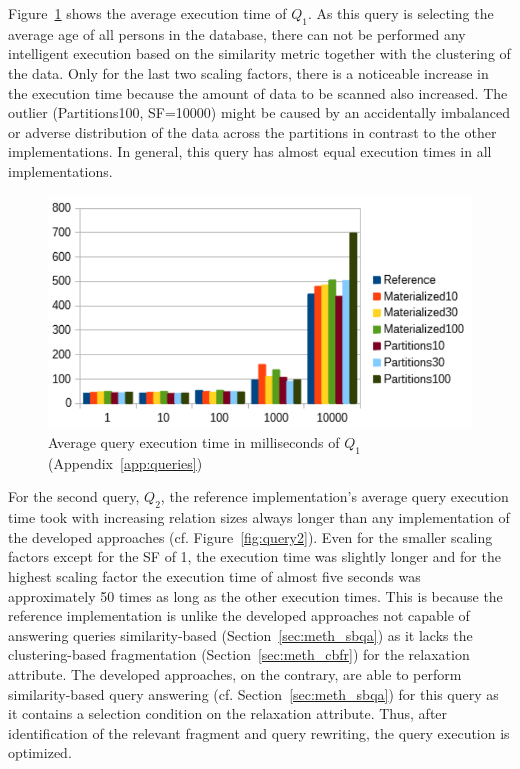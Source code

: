 Figure~\ref{fig:query1} shows the average execution time of $Q_1$. As this query is selecting the average age of all persons in the database, 
there can not be performed any intelligent execution based on the similarity metric together with the clustering of the data. Only for the last two scaling
factors, there is a noticeable increase in the execution time because the amount of data to be scanned also increased. The outlier (Partitions100, SF=10000)
might be caused by an accidentally imbalanced or adverse distribution of the data across the partitions in contrast to the other implementations. In general,
this query has almost equal execution times in all implementations.
\begin{figure}[h]
    \centering
    \includegraphics[scale=0.8]{charts/Query1.pdf}
    \caption{Average query execution time in milliseconds of $Q_1$ (Appendix~\ref{app:queries})}
    \label{fig:query1}
\end{figure}

For the second query, $Q_2$, the reference implementation's average query execution time took with increasing relation sizes always longer than any
implementation of the developed approaches (cf. Figure~\ref{fig:query2}). Even for the smaller scaling factors except for the SF of 1, the execution time was
slightly longer and for the highest scaling factor the execution time of almost five seconds was approximately 50 times as long as the other execution times.
This is because the reference implementation is unlike the developed approaches not capable of answering queries similarity-based (Section~\ref{sec:meth_sbqa})
as it lacks the
clustering-based fragmentation (Section~\ref{sec:meth_cbfr}) for the relaxation attribute. The developed approaches, on the contrary, are able to perform
similarity-based query answering (cf. Section~\ref{sec:meth_sbqa}) for this query as it contains a selection condition on the relaxation attribute. Thus, 
after identification of the relevant fragment and query rewriting, the query execution is optimized.

